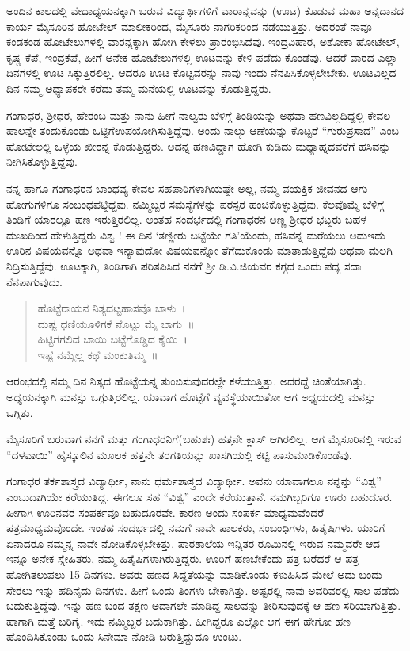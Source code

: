 {ಅಂದಿನ ಕಾಲದಲ್ಲಿ ವೇದಾಧ್ಯಯನಕ್ಕಾಗಿ ಬರುವ ವಿದ್ಯಾರ್ಥಿಗಳಿಗೆ ವಾರಾನ್ನವನ್ನು (ಊಟ) ಕೊಡುವ ಮಹಾ ಅನ್ನದಾನದ ಕಾರ್ಯ ಮೈಸೂರಿನ ಹೋಟೇಲ್ ಮಾಲೀಕ\-ರಿಂದ, ಮೈಸೂರು ನಾಗರಿಕರಿಂದ ನಡೆಯುತ್ತಿತ್ತು. ಅದರಂತೆ ನಾವೂ ಕಂಡ\enginline{-}ಕಂಡ  ಹೋಟೇಲುಗಳಲ್ಲಿ ವಾರನ್ನಕ್ಕಾಗಿ ಹೋಗಿ ಕೇಳಲು ಪ್ರಾರಂಭಿಸಿದೆವು. ಇಂದ್ರವಿಹಾರ,  ಅಶೋಕಾ ಹೋಟೇಲ್,  ಕೃಷ್ಣ ಕೆಪೆ, ಇಂದ್ರಕೆಪೆ,  ಹೀಗೆ ಅನೇಕ ಹೋಟೇಲುಗಳಲ್ಲಿ ಊಟವನ್ನು ಕೇಳಿ ಪಡೆದು ಕೊಂಡೆವು. ಆದರೆ ವಾರದ ಎಲ್ಲಾ ದಿನಗಳಲ್ಲಿ ಊಟ ಸಿಕ್ಕುತ್ತಿರಲಿಲ್ಲ. ಆದರೂ ಊಟ ಕೊಟ್ಟವರನ್ನು ನಾವು ಇಂದು ನೆನಪಿಸಿಕೊಳ್ಳಲೇಬೇಕು. ಊಟವಿಲ್ಲದ ದಿನ ನಮ್ಮ ಅಧ್ಯಾಪಕರೇ ಕರೆದು ತಮ್ಮ ಮನೆಯಲ್ಲಿ ಊಟವನ್ನು ಕೊಡುತ್ತಿದ್ದರು. 

ಗಂಗಾಧರ, ಶ್ರೀಧರ, ಹೇರಂಬ  ಮತ್ತು ನಾನು ಹೀಗೆ  ನಾಲ್ವರು ಬೆಳಿಗ್ಗೆ ತಿಂಡಿಯನ್ನು ಅಥವಾ ಹಣವಿಲ್ಲದಿದ್ದಲ್ಲಿ ಕೇವಲ  ಹಾಲನ್ನೇ ತಂದುಕೊಂಡು ಒಟ್ಟಿಗೆ\break ಉಪಯೋಗಿಸುತ್ತಿದ್ದೆವು. ಅಂದು ನಾಲ್ಕು ಆಣೆಯನ್ನು ಕೊಟ್ಟರೆ “ಗುರುಪ್ರಸಾದ” ಎಂಬ ಹೋಟೇಲಲ್ಲಿ  ಒಳ್ಳೆಯ ಖೀರನ್ನ ಕೊಡುತ್ತಿದ್ದರು. ಅದನ್ನ ಹಣವಿದ್ದಾಗ ಹೋಗಿ ಕುಡಿದು ಮಧ್ಯಾಹ್ನದವರೆಗೆ ಹಸಿವನ್ನು ನೀಗಿಸಿಕೊಳ್ಳುತ್ತಿದ್ದೆವು. 

ನನ್ನ ಹಾಗೂ ಗಂಗಾಧರನ ಬಾಂಧವ್ಯ ಕೇವಲ ಸಹಪಾಠಿಗಳಾಗಿಯಷ್ಟೇ ಅಲ್ಲ, ನಮ್ಮ ವಯಕ್ತಿಕ ಜೀವನದ ಆಗು ಹೋಗುಗಳಿಗೂ  ಸಂಬಂಧಪಟ್ಟಿದ್ದವು. ನಮ್ಮಿಬ್ಬರ ಸಮಸ್ಯೆಗಳನ್ನು ಪರಸ್ಪರ ಹಂಚಿಕೊಳ್ಳುತ್ತಿದ್ದೆವು. ಕೆಲವೊಮ್ಮೆ  ಬೆಳಿಗ್ಗೆ ತಿಂಡಿಗೆ ಯಾರಲ್ಲೂ ಹಣ ಇರುತ್ತಿರಲಿಲ್ಲ. ಅಂತಹ ಸಂದರ್ಭದಲ್ಲಿ ಗಂಗಾಧರನ ಅಣ್ಣ  ಶ್ರೀಧರ ಭಟ್ಟರು ಬಹಳ ದುಃಖ\-ದಿಂದ ಹೇಳುತ್ತಿದ್ದರು  \enginline{-} ವಿಶ್ವ ! ಈ ದಿನ ‘ತಣ್ಣೀರು ಬಟ್ಟೆಯೇ ಗತಿ’ಯೆಂದು, ಹಸಿವನ್ನ ಮರೆಯಲು ಅದು\enginline{-}ಇದು ಊರಿನ ವಿಷಯವನ್ನೊ ಅಥವಾ ಇನ್ಯಾವುದೋ ವಿಷಯವನ್ನೋ ತೆಗೆದುಕೊಂಡು ಮಾತಾಡುತ್ತಿದ್ದೆವು ಅಥವಾ ಮಲಗಿ ನಿದ್ರಿಸುತ್ತಿದ್ದೆವು. ಊಟಕ್ಕಾಗಿ, ತಿಂಡಿಗಾಗಿ ಪರಿತಪಿಸಿದ ನನಗೆ ಶ್ರೀ ಡಿ.ವಿ.ಜಿಯವರ ಕಗ್ಗದ ಒಂದು ಪದ್ಯ ಸದಾ \hbox{ನೆನಪಾಗುವುದು.}

\begin{verse}
ಹೊಟ್ಟೆರಾಯನ ನಿತ್ಯದಟ್ಟಹಾಸವೊ ಬಾಳು~। \\
ದುಷ್ಟ ಧಣಿಯೂಳಿಗಕೆ ನೊಟ್ಟು ಮೈ ಬಾಗು~॥ \\
ಹಿಟ್ಟಿಗಗಲಿದ ಬಾಯಿ ಬಟ್ಟೆಗೊಡ್ಡಿದ ಕೈಯಿ~। \\
ಇಷ್ಟೆ ನಮ್ಮೆಲ್ಲ  ಕಥೆ ಮಂಕುತಿಮ್ಮ~॥ 
\end{verse}

ಆರಂಭದಲ್ಲಿ ನಮ್ಮ ದಿನ ನಿತ್ಯದ ಹೊಟ್ಟೆಯನ್ನ ತುಂಬಿಸುವುದರಲ್ಲೇ ಕಳೆಯುತ್ತಿತ್ತು. ಅದರದ್ದೆ ಚಿಂತೆಯಾಗಿತ್ತು.  ಅಧ್ಯಯನಕ್ಕಾಗಿ ಮನಸ್ಸು ಒಗ್ಗುತ್ತಿರಲಿಲ್ಲ. ಯಾವಾಗ \hbox{ಹೊಟ್ಟೆಗೆ}  ವ್ಯವಸ್ಥೆಯಾಯಿತೋ ಆಗ ಅಧ್ಯಯದಲ್ಲಿ ಮನಸ್ಸು  ಒಗ್ಗಿತು. 

ಮೈಸೂರಿಗೆ ಬರುವಾಗ ನನಗೆ ಮತ್ತು ಗಂಗಾಧರನಿಗೆ(ಬಹುಶಃ) ಹತ್ತನೇ ಕ್ಲಾಸ್ ಆಗಿರ\-ಲಿಲ್ಲ. ಆಗ ಮೈಸೂರಿನಲ್ಲಿ ಇರುವ “ದಳವಾಯಿ” ಹೈಸ್ಕೂಲಿನ ಮೂಲಕ ಹತ್ತನೇ ತರಗತಿಯನ್ನು ಖಾಸಗಿಯಲ್ಲಿ ಕಟ್ಟಿ ಪಾಸುಮಾಡಿಕೊಂಡೆವು. 

ಗಂಗಾಧರ ತರ್ಕಶಾಸ್ತ್ರದ ವಿದ್ಯಾರ್ಥೀ, ನಾನು ಧರ್ಮಶಾಸ್ತ್ರದ ವಿದ್ಯಾರ್ಥೀ. ಅವನು ಯಾವಾಗಲೂ ನನ್ನನ್ನು “ವಿಶ್ವ” ಎಂಬುದಾಗಿಯೇ ಕರೆಯುತಿದ್ದ. ಈಗಲೂ ಸಹ “ವಿಶ್ವ” ಎಂದೇ ಕರೆಯುತ್ತಾನೆ. ನಮಗಿಬ್ಬರಿಗೂ ಊರು ಬಹುದೂರ. ಹೀಗಾಗಿ ಊರಿನವರ ಸಂಪರ್ಕವೂ ಬಹುದೂರವೇ. ಕಾರಣ ಅಂದು  ಸಂಪರ್ಕ ಮಾಧ್ಯಮವೆಂದರೆ ಪತ್ರಮಾಧ್ಯಮವೊಂದೇ. ಇಂತಹ ಸಂದರ್ಭದಲ್ಲಿ ನಮಗೆ ನಾವೇ ಪಾಲಕರು,  ಸಂಬಂಧಿಗಳು,  ಹಿತೈಷಿಗಳು. ಯಾರಿಗೆ ಏನಾದರೂ ನಮ್ಮನ್ನ  ನಾವೇ ನೋಡಿಕೊಳ್ಳಬೇಕಿತ್ತು.  ಪಾಠಶಾಲೆಯ ಇನ್ನಿತರ  ರೂಮಿನಲ್ಲಿ  ಇರುವ ನಮ್ಮವರೇ ಆದ ಇನ್ನೂ ಅನೇಕ ಸ್ನೇಹಿತರು,  ನಮ್ಮ ಹಿತೈಷಿಗಳಾಗಿರು\-ತ್ತಿದ್ದರು.  ಊರಿಗೆ ಹಣಬೇಕೆಂದು ಪತ್ರ ಬರೆದರೆ ಆ ಪತ್ರ ಹೋಗಿ\break ತಲುಪಲು 15 ದಿನಗಳು. ಅವರು ಹಣದ ಸಿದ್ದತೆಯನ್ನು ಮಾಡಿಕೊಂಡು  ಕಳುಹಿಸಿದ ಮೇಲೆ ಅದು ಬಂದು ಸೇರಲು ಇನ್ನು ಹದಿನೈದು    ದಿನಗಳು. ಹೀಗೆ ಒಂದು ತಿಂಗಳು ಬೇಕಾಗಿತ್ತು.  ಅಷ್ಟರಲ್ಲಿ ನಾವು ಅವರಿವರಲ್ಲಿ ಸಾಲ ಪಡೆದು ಬದುಕುತ್ತಿದ್ದೆವು. ಇನ್ನು ಹಣ ಬಂದ ತಕ್ಷಣ ಅದಾಗಲೇ ಮಾಡಿದ್ದ ಸಾಲವನ್ನು ತೀರಿಸುವುದಕ್ಕೆ  ಆ ಹಣ ಸರಿಯಾಗುತ್ತಿತ್ತು. ಹಾಗಾಗಿ ಮತ್ತೆ ಬರಿಗೈ. ಇದು ನಮ್ಮಿಬ್ಬರ ಬದುಕಾಗಿತ್ತು. ಹೀಗಿದ್ದರೂ ಎಲ್ಲೋ ಆಗ ಈಗ ಹೇಗೋ ಹಣ ಹೊಂದಿಸಿಕೊಂಡು ಒಂದು ಸಿನೇಮಾ ನೋಡಿ ಬರುತ್ತಿದ್ದುದೂ ಉಂಟು. 

}
